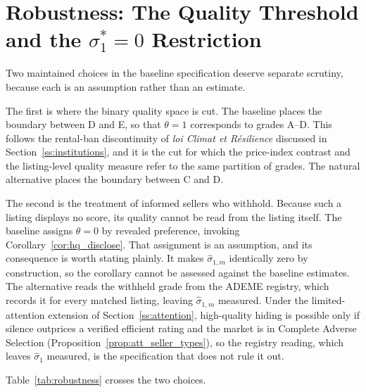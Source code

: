 
\section{Robustness: The Quality Threshold and the $\sigma_1^*=0$ Restriction}
\label{app:robustness}

Two maintained choices in the baseline specification deserve separate scrutiny, because each
is an assumption rather than an estimate.

The first is where the binary quality space is cut. The baseline places the boundary between
D and E, so that $\theta=1$ corresponds to grades A--D. This follows the rental-ban
discontinuity of \emph{loi Climat et R\'esilience} discussed in
Section~\ref{ss:institutions}, and it is the cut for which the price-index contrast and the
listing-level quality measure refer to the same partition of grades. The natural alternative
places the boundary between C and D.

The second is the treatment of informed sellers who withhold. Because such a listing displays
no score, its quality cannot be read from the listing itself. The baseline assigns
$\theta=0$ by revealed preference, invoking Corollary~\ref{cor:hq_disclose}. That assignment
is an assumption, and its consequence is worth stating plainly. It makes
$\hat\sigma_{1,m}$ identically zero by construction, so the corollary cannot be assessed
against the baseline estimates. The alternative reads the withheld grade from the ADEME
registry, which records it for every matched listing, leaving $\hat\sigma_{1,m}$ measured. Under the limited-attention extension of Section~\ref{ss:attention}, high-quality hiding is possible only if silence outprices a verified efficient rating and the market is in Complete Adverse Selection (Proposition~\ref{prop:att_seller_types}), so the registry reading, which leaves $\hat\sigma_1$ measured, is the specification that does not rule it out.

Table~\ref{tab:robustness} crosses the two choices.


